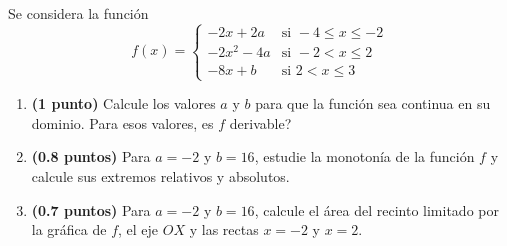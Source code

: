 
Se considera la función
\[
f(x)=\begin{cases}
-2x+2a & \text{si }-4\leq x\leq -2\\
-2x^2-4a & \text{si }-2<x\leq 2\\
-8x+b & \text{si }2<x\leq 3
\end{cases}
\]
\begin{enumerate}[label=\alph*)]
  \item \textbf{(1 punto)} Calcule los valores $a$ y $b$ para que la función
  sea continua en su dominio. Para esos valores, \textquestiondown{}es $f$
  derivable?
  \item \textbf{(0.8 puntos)} Para $a=-2$ y $b=16$, estudie la monotonía
  de la función $f$ y calcule sus extremos relativos y absolutos.
  \item \textbf{(0.7 puntos)} Para $a=-2$ y $b=16$, calcule el área del
  recinto limitado por la gráfica de $f$, el eje $OX$ y las rectas $x=-2$
  y $x=2$.
\end{enumerate}
